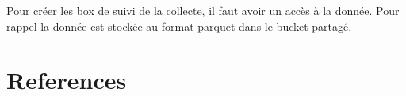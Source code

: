 \documentclass[
  letterpaper,
  DIV=11,
  numbers=noendperiod]{scrreprt}
\newlength{\cslhangindent}
\newlength{\cslentryspacingunit} %
\newenvironment{CSLReferences}[2] %
 {%
  \setlength{\parindent}{0pt}
  \ifodd #1
  \let\oldpar\par
  \def\par{\hangindent=\cslhangindent\oldpar}
  \fi
  \setlength{\parskip}{#2\cslentryspacingunit}
 }%
 {}
\begin{document}
Pour créer les box de suivi de la collecte, il faut avoir un accès à la
donnée. Pour rappel la donnée est stockée au format parquet dans le
bucket partagé.


\hypertarget{section}{%
\chapter{}\label{section}}


\hypertarget{section-1}{%
\chapter{}\label{section-1}}


\hypertarget{section-2}{%
\chapter{}\label{section-2}}


\hypertarget{section-3}{%
\chapter{}\label{section-3}}


\hypertarget{references}{%
\chapter*{References}\label{references}}

\hypertarget{refs}{}
\begin{CSLReferences}{0}{0}
\end{CSLReferences}



\printindex
\end{document}
